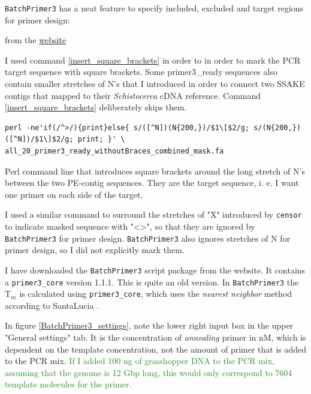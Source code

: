 \documentclass{article}\usepackage[]{graphicx}\usepackage[]{color}
\newcommand{\roger}[1]{ \textcolor[named]{ForestGreen}{#1} }
\begin{document}
\texttt{BatchPrimer3} has a neat feature to specify included, excluded and target regions for primer design:

\begin{epigraphs}
{from the \href{http://probes.pw.usda.gov/batchprimer3/}{website}}
\end{epigraphs}

I used command \ref{insert_square_brackets} in order to in order to mark the PCR target sequence with square brackets. Some primer3\_ready sequences also contain smaller stretches of N's that I introduced in order to connect two SSAKE contigs that mapped to their \textit{Schistocerca} cDNA reference. Command \ref{insert_square_brackets} deliberately skips them.

\begin{command}
\captionsetup{type=command}
\begin{Verbatim}[fontsize=\footnotesize]
perl -ne'if(/^>/){print}else{ s/([^N])(N{200,})/$1\[$2/g; s/(N{200,})([^N])/$1\]$2/g; print; }' \
all_20_primer3_ready_withoutBraces_combined_mask.fa
\end{Verbatim}
\caption{Perl command line that introduces square brackets around the long stretch of N's between the two PE-contig sequences. They are the target sequence, i. e. I want one primer on each side of the target.}
\label{insert_square_brackets}
\end{command}

I used a similar command to surround the stretches of "X" introduced by \texttt{censor} to indicate masked sequence with "<>", so that they are ignored by \texttt{BatchPrimer3} for primer design. \texttt{BatchPrimer3} also ignores stretches of N for primer design, so I did not explicitly mark them.

I have downloaded the \texttt{BatchPrimer3} script package from the website. It contains a \texttt{primer3\_core} version 1.1.1. This is quite an old version. In \texttt{BatchPrimer3} the T$_{m}$ is calculated using \texttt{primer3\_core}, which uses the \textit{nearest neighbor} method according to SantaLucia \citep{You2008}.

In figure \ref{BatchPrimer3_settings}, note the lower right input box in the upper "General settings" tab. It is the concentration of \textit{annealing} primer in nM, which is dependent on the template concentration, not the amount of primer that is added to the PCR mix. \roger{If I added 100 ng of grasshopper DNA to the PCR mix, assuming that the genome is 12 Gbp long, this would only correspond to 7604 template molecules for the primer. }
\end{document}
